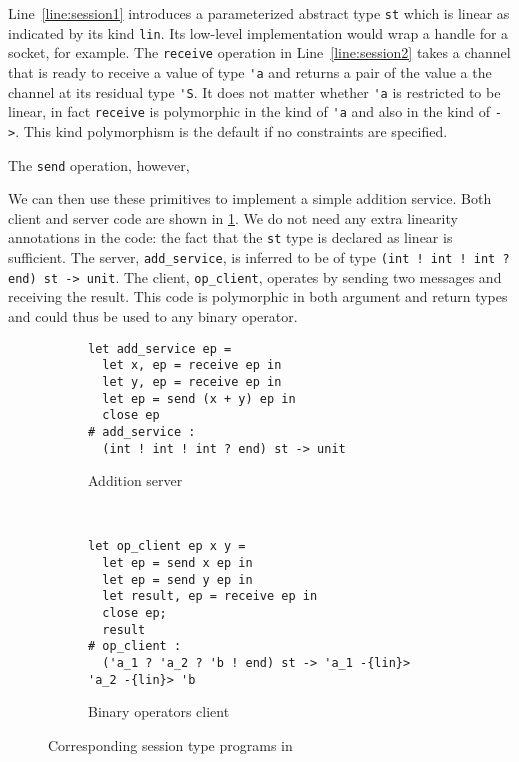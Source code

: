 Line~\ref{line:session1} introduces a parameterized abstract
type \lstinline{st} which is linear as indicated
by its kind \lstinline{lin}. Its low-level implementation would wrap a
handle for a socket, for example. The \lstinline{receive}  operation
in Line~\ref{line:session2} takes a channel that is ready to receive a
value of type \lstinline{'a} and returns a pair of the value a the
channel at its residual type \lstinline{'S}. It does not matter
whether \lstinline{'a} is restricted to be linear, in fact
\lstinline{receive} is polymorphic in the kind of \lstinline{'a} and
also in the kind of \lstinline{->}. This kind polymorphism is the
default if no constraints are specified.

The \lstinline{send} operation, however, 


We can then use these primitives to implement a simple addition service.
Both client and server code are shown in
\cref{fig:sessiontype}.
We do not need any extra linearity annotations in the code: the fact
that the \texttt{st} type is declared as linear is sufficient.
The server, \lstinline{add_service}, is inferred to be of type
\lstinline{(int ! int ! int ? end) st -> unit}.
The client, \lstinline/op_client/, operates by sending two messages
and receiving the result.
This code is polymorphic in both argument and return types and could thus
be used to any binary operator.
%
\begin{figure}[!h]
  \begin{subfigure}[t]{.5\linewidth}
\begin{lstlisting}
let add_service ep =
  let x, ep = receive ep in
  let y, ep = receive ep in
  let ep = send (x + y) ep in
  close ep
# add_service :
  (int ! int ! int ? end) st -> unit
\end{lstlisting}
    \caption{Addition server}
  \end{subfigure}~
  \begin{subfigure}[t]{.5\linewidth}
\begin{lstlisting}
let op_client ep x y =
  let ep = send x ep in
  let ep = send y ep in
  let result, ep = receive ep in
  close ep;
  result
# op_client :
  ('a_1 ? 'a_2 ? 'b ! end) st -> 'a_1 -{lin}> 'a_2 -{lin}> 'b
\end{lstlisting}
    \caption{Binary operators client}
  \end{subfigure}
  \caption{Corresponding session type programs in \lang}
  \label{fig:sessiontype}
\end{figure}

